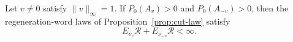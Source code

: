 \begin{proposition}
\label{prop:radius-moment}
Let $v\ne0$ satisfy $\|v\|_\infty=1$.  If
$P_0(A_v)>0$ and $P_0(A_{-v})>0$, then the regeneration-word laws of
Proposition~\ref{prop:cut-law} satisfy
\begin{equation}
  E_{\nu_v}\mathcal R+E_{\nu_{-v}}\mathcal R<\infty.
  \label{eq:radius-moment}
\end{equation}
\end{proposition}

